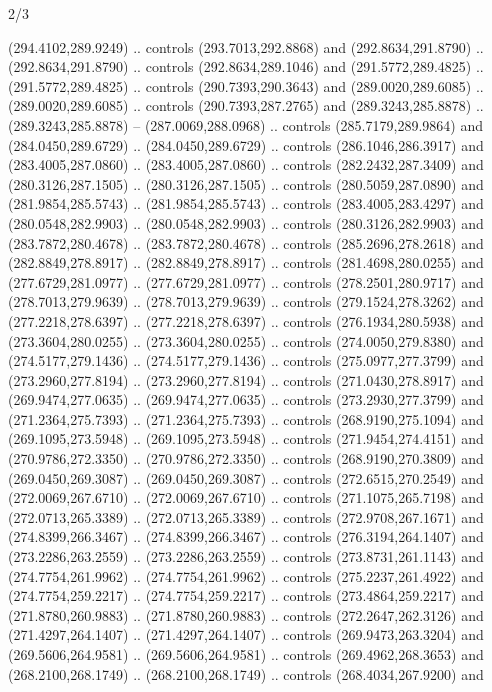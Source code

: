 \begin{flagdescription}{2/3}
\begin{scope}[xshift=0.5\flaglength,yshift=0.5\flagwidth,scale=\flagwidth/318.91]
\begin{scope}[y=0.8pt, x=0.8pt, yscale=-1,shift={(-298.97,-199.32)}]
  (294.4102,289.9249) .. controls (293.7013,292.8868) and (292.8634,291.8790) ..
  (292.8634,291.8790) .. controls (292.8634,289.1046) and (291.5772,289.4825) ..
  (291.5772,289.4825) .. controls (290.7393,290.3643) and (289.0020,289.6085) ..
  (289.0020,289.6085) .. controls (290.7393,287.2765) and (289.3243,285.8878) ..
  (289.3243,285.8878) -- (287.0069,288.0968) .. controls (285.7179,289.9864) and
  (284.0450,289.6729) .. (284.0450,289.6729) .. controls (286.1046,286.3917) and
  (283.4005,287.0860) .. (283.4005,287.0860) .. controls (282.2432,287.3409) and
  (280.3126,287.1505) .. (280.3126,287.1505) .. controls (280.5059,287.0890) and
  (281.9854,285.5743) .. (281.9854,285.5743) .. controls (283.4005,283.4297) and
  (280.0548,282.9903) .. (280.0548,282.9903) .. controls (280.3126,282.9903) and
  (283.7872,280.4678) .. (283.7872,280.4678) .. controls (285.2696,278.2618) and
  (282.8849,278.8917) .. (282.8849,278.8917) .. controls (281.4698,280.0255) and
  (277.6729,281.0977) .. (277.6729,281.0977) .. controls (278.2501,280.9717) and
  (278.7013,279.9639) .. (278.7013,279.9639) .. controls (279.1524,278.3262) and
  (277.2218,278.6397) .. (277.2218,278.6397) .. controls (276.1934,280.5938) and
  (273.3604,280.0255) .. (273.3604,280.0255) .. controls (274.0050,279.8380) and
  (274.5177,279.1436) .. (274.5177,279.1436) .. controls (275.0977,277.3799) and
  (273.2960,277.8194) .. (273.2960,277.8194) .. controls (271.0430,278.8917) and
  (269.9474,277.0635) .. (269.9474,277.0635) .. controls (273.2930,277.3799) and
  (271.2364,275.7393) .. (271.2364,275.7393) .. controls (268.9190,275.1094) and
  (269.1095,273.5948) .. (269.1095,273.5948) .. controls (271.9454,274.4151) and
  (270.9786,272.3350) .. (270.9786,272.3350) .. controls (268.9190,270.3809) and
  (269.0450,269.3087) .. (269.0450,269.3087) .. controls (272.6515,270.2549) and
  (272.0069,267.6710) .. (272.0069,267.6710) .. controls (271.1075,265.7198) and
  (272.0713,265.3389) .. (272.0713,265.3389) .. controls (272.9708,267.1671) and
  (274.8399,266.3467) .. (274.8399,266.3467) .. controls (276.3194,264.1407) and
  (273.2286,263.2559) .. (273.2286,263.2559) .. controls (273.8731,261.1143) and
  (274.7754,261.9962) .. (274.7754,261.9962) .. controls (275.2237,261.4922) and
  (274.7754,259.2217) .. (274.7754,259.2217) .. controls (273.4864,259.2217) and
  (271.8780,260.9883) .. (271.8780,260.9883) .. controls (272.2647,262.3126) and
  (271.4297,264.1407) .. (271.4297,264.1407) .. controls (269.9473,263.3204) and
  (269.5606,264.9581) .. (269.5606,264.9581) .. controls (269.4962,268.3653) and
  (268.2100,268.1749) .. (268.2100,268.1749) .. controls (268.4034,267.9200) and

\end{scope}
\end{scope}
\end{flagdescription}
